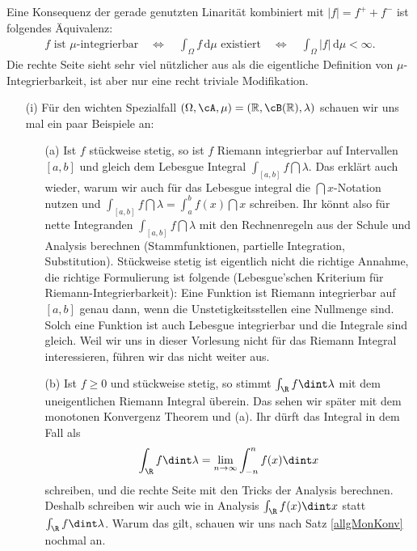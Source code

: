 Eine Konsequenz der gerade genutzten Linarit\"at kombiniert mit $|f|=f^++f^-$ ist folgendes \"Aquivalenz:
\begin{align}\label{Betrag}
	f\text{ ist }\mu\text{-integrierbar}\quad \Longleftrightarrow\quad \int_\Omega f\,\mathrm{d}\mu\text{ existiert}\quad \Longleftrightarrow\quad \int_\Omega |f|\,\mathrm{d}\mu<\infty.
\end{align}
Die rechte Seite sieht sehr viel n\"utzlicher aus als die eigentliche Definition von $\mu$-Integrierbarkeit, ist aber nur eine recht triviale Modifikation.
\begin{beispiel}\label{bsp7}
	\begin{itemize}
		\item[(i)] Für den wichten Spezialfall $(\Omega, \cA, \mu) = (\mathbb{R}, \cB(\mathbb{R}), \lambda)$ schauen wir uns mal ein paar Beispiele an:
		\begin{itemize}
			\item[(a)] Ist $f$ st\"uckweise stetig, so ist $f$ Riemann integrierbar auf Intervallen $[a,b]$ und gleich dem Lebesgue Integral $\int_{[a,b]} f \dint \lambda$. Das erkl\"art auch wieder, warum wir auch f\"ur das Lebesgue integral die $\dint x$-Notation nutzen und $\int_{[a,b]} f \dint \lambda=\int_a^b f(x)\dint x$ schreiben. Ihr k\"onnt also f\"ur nette Integranden $\int_{[a,b]} f\dint \lambda$ mit den Rechnenregeln aus der Schule und Analysis berechnen (Stammfunktionen, partielle Integration, Substitution). St\"uckweise stetig ist eigentlich nicht die richtige Annahme, die richtige Formulierung ist folgende (Lebesgue'schen Kriterium für Riemann-Integrierbarkeit): Eine Funktion ist Riemann integrierbar auf $[a,b]$ genau dann, wenn die Unstetigkeitsstellen eine Nullmenge sind. Solch eine Funktion ist auch Lebesgue integrierbar und die Integrale sind gleich. Weil wir uns in dieser Vorlesung nicht f\"ur das Riemann Integral interessieren, f\"uhren wir das nicht weiter aus.	
			\item[(b)] Ist $f\geq 0$ und st\"uckweise stetig, so stimmt $\int_\R f \dint \lambda$ mit dem uneigentlichen Riemann Integral \"uberein. Das sehen wir sp\"ater mit dem monotonen Konvergenz Theorem und (a). Ihr d\"urft das Integral in dem Fall als
			\begin{align}\label{trick}
				\int_\R f\dint \lambda=\lim_{n\to\infty} \int_{-n}^n f(x)\dint x
			\end{align}
			schreiben, und die rechte Seite mit den Tricks der Analysis berechnen. Deshalb schreiben wir auch wie in Analysis $\int_\R f(x)\dint x$ statt $\int_\R f \dint \lambda$. Warum das gilt, schauen wir uns nach Satz \ref{allgMonKonv} nochmal an.

\end{itemize}
\end{itemize}
\end{beispiel}
